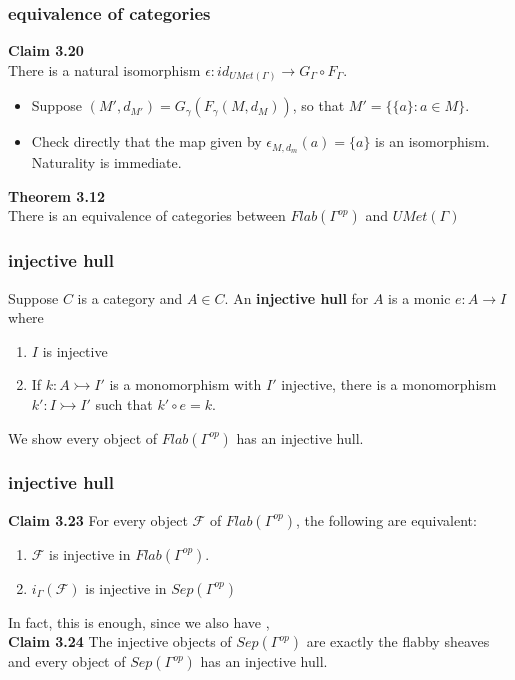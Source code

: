 \documentclass{beamer}
\begin{document}
\begin{frame}
\frametitle{equivalence of categories}
\textbf{Claim 3.20}\\
There is a natural isomorphism $\epsilon: id_{UMet(\Gamma)} \rightarrow G_\Gamma \circ F_\Gamma$. 


\begin{itemize}
	\item Suppose $(M',d_{M'})=G_\gamma(F_\gamma(M,d_M))$, so that $M'=\{\{a\}: a \in M\}$.
	\item Check directly that the map given by  $\epsilon_{M,d_m}(a)=\{a\}$ is an isomorphism. Naturality is immediate.
\end{itemize}

\textbf{Theorem 3.12}\\
There is an equivalence of categories between $Flab(\Gamma^{op})$ and $UMet(\Gamma)$
\end{frame}

\begin{frame}
\frametitle{injective hull}
\begin{definition}
Suppose $C$ is a category and $A \in C$. An \textbf{injective hull} for $A$ is a monic $e:A \rightarrow I$ where 
\begin{enumerate}
	\item $I$ is injective
	\item If $k: A \rightarrowtail I'$ is a monomorphism with $I'$ injective, there is a monomorphism $k':I \rightarrowtail I'$ such that $k' \circ e =k$.	
\end{enumerate}
\end{definition}
\[\]
We show every object of $Flab(\Gamma^{op})$ has an injective hull.
\end{frame}

\begin{frame}
\frametitle{injective hull}
\textbf{Claim 3.23} For every object $\mathcal{F}$ of $Flab(\Gamma^{op})$, the following are equivalent:
\begin{enumerate}
	\item $\mathcal{F}$ is injective in $Flab(\Gamma^{op})$.
	\item $i_\Gamma(\mathcal{F})$ is injective in $Sep(\Gamma^{op})$
\end{enumerate}
\[\]
In fact, this is enough, since we also have \cite{Coulon},\\

\textbf{Claim 3.24} The injective objects of $Sep(\Gamma^{op})$ are exactly the flabby sheaves and every object of $Sep(\Gamma^{op})$ has an injective hull.
\end{frame}	
\end{document}
